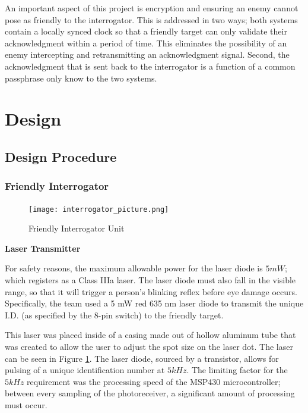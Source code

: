 \documentclass[letterpaper,10pt]{article}
\begin{document}
\begin{spacing}{1.15}
An important aspect of this project is encryption and ensuring an enemy cannot pose as friendly to the interrogator. This is addressed in two ways; both systems contain a locally synced clock so that a friendly target can only validate their acknowledgment within a period of time. This eliminates the possibility of an enemy intercepting and retransmitting an acknowledgment signal. Second, the acknowledgment that is sent back to the interrogator is a function of a common passphrase only know to the two systems.

\section{Design}

\subsection{Design Procedure} 

\subsubsection{Friendly Interrogator}
\begin{figure} [H]
	\centering
	\texttt{[image: interrogator\_picture.png]}
	\caption{Friendly Interrogator Unit\label{fig:interrogator-picture}}
\end{figure}

\hspace{5mm}\textbf{Laser Transmitter} \label{section:laser-transmitter-design-procedure}

For safety reasons, the maximum allowable power for the laser diode is $5mW$; which registers as a Class IIIa laser. The laser diode must also fall in the visible range, so that it will trigger a person's blinking reflex before eye damage occurs. Specifically, the team used a 5 mW red 635 nm laser diode to transmit the unique I.D. (as specified by the 8-pin switch) to the friendly target. 

This laser was placed inside of a casing made out of hollow aluminum tube that was created to allow the user to adjust the spot size on the laser dot. The laser can be seen in Figure \ref{fig:interrogator-picture}. The laser diode, sourced by a transistor, allows for pulsing of a unique identification number at $5kHz$. The limiting factor for the $5kHz$ requirement was the processing speed of the MSP430 microcontroller; between every sampling of the photoreceiver, a significant amount of processing must occur. 


\end{spacing}
\end{document}
